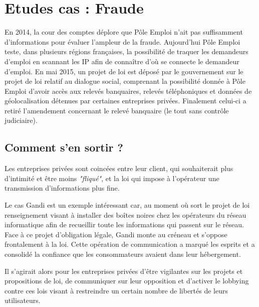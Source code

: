 \documentclass[a4paper,12pt]{article}
\begin{document}
\section{Etudes cas : Fraude }
En 2014, la cour des comptes déplore que Pôle Emploi n'ait pas suffisamment d'informations pour évaluer l'ampleur de la fraude. Aujourd'hui Pôle Emploi teste, dans plusieurs régions françaises, la possibilité de traquer les demandeurs d'emploi en scannant les IP afin de connaître d'où se connecte le demandeur d'emploi. 
En mai 2015, un projet de loi est déposé par le gouvernement sur le projet de loi relatif au dialogue social, comprenant la possibilité donnée à Pôle Emploi d'avoir accès aux relevés banquaires, relevés téléphoniques et données de géolocalisation détenues par certaines entreprises privées. Finalement celui-ci a retiré l'amendement concernant le relevé banquaire (le tout sans contrôle judiciaire). 
\subsection{Comment s'en sortir ? }
Les entreprises privées sont coincées entre leur client, qui souhaiterait plus d'intimité et être moins \textit{"fliqué"}, et la loi qui impose à l'opérateur une transmission d'informations plus fine. 

Le cas Gandi est un exemple intéressant car, au moment où sort le projet de loi renseignement visant à installer des boîtes noires chez les opérateurs du réseau informatique afin de recueillir toute les informations qui passent sur le réseau. Face à ce projet d'obligation légale, Gandi monte au créneau et s'oppose frontalement à la loi. Cette opération de communication a marqué les esprits et a consolidé la confiance que les consommateurs avaient dans leur hébergement. 

Il s'agirait alors pour les entreprises privées d'être vigilantes sur les projets et propositions de loi, de communiquer sur leur opposition et d'activer le lobbying contre ces lois visant à restreindre un certain nombre de libertés de leurs utilisateurs. 




\newpage 
\end{document}
